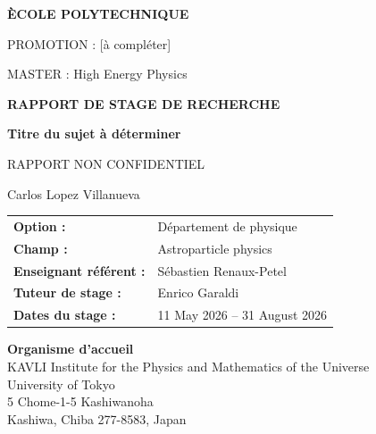 \documentclass[%
 reprint,
nofootinbib,
 amsmath,amssymb,
 aps,
]{revtex4-2}
\begin{document}

\onecolumngrid
\pagestyle{empty}
\thispagestyle{empty}
    \begin{center}
        {\large\bfseries \`ECOLE POLYTECHNIQUE\par}
        \vspace{1.2cm}
        {\large PROMOTION : [\`a compl\'eter]\par}
        {\large MASTER : High Energy Physics\par}

        \vfill

        {\large\bfseries RAPPORT DE STAGE DE RECHERCHE\par}
        \vspace{0.8cm}
        {\large\bfseries Titre du sujet \`a d\'eterminer\par}
        \vspace{0.8cm}
        {\large RAPPORT NON CONFIDENTIEL\par}

        \vfill

        {\large Carlos Lopez Villanueva\par}
        \vspace{1.2cm}

        \begin{tabular}{@{}ll@{}}
            \textbf{Option :} & D\'epartement de physique \\
            \textbf{Champ :} & Astroparticle physics \\
            \textbf{Enseignant r\'ef\'erent :} & S\'ebastien Renaux-Petel \\
            \textbf{Tuteur de stage :} & Enrico Garaldi \\
            \textbf{Dates du stage :} & 11 May 2026 -- 31 August 2026
        \end{tabular}

        \vfill

        \begin{minipage}{0.8\textwidth}
            \centering
            \textbf{Organisme d'accueil}\\[0.2cm]
            KAVLI Institute for the Physics and Mathematics of the Universe\\
            University of Tokyo\\[0.2cm]
            5 Chome-1-5 Kashiwanoha\\
            Kashiwa, Chiba 277-8583, Japan
        \end{minipage}
    \end{center}
\end{document}

